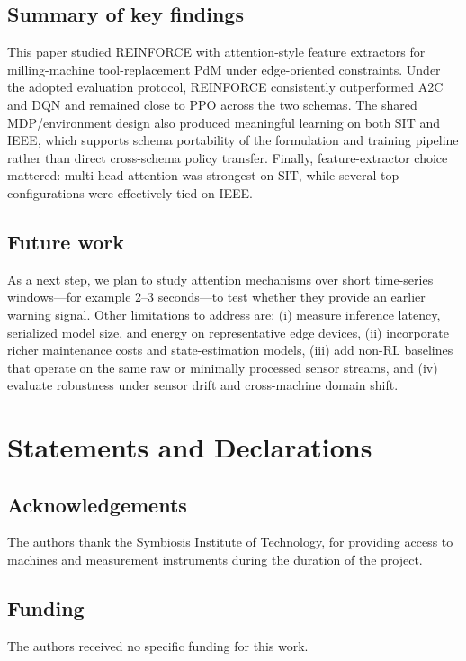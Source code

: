 \documentclass[sn-vancouver-num]{sn-jnl}%
\begin{document}
\subsection{Summary of key findings}
This paper studied \textsc{REINFORCE} with attention-style feature extractors for milling-machine tool-replacement PdM under edge-oriented constraints. Under the adopted evaluation protocol, \textsc{REINFORCE} consistently outperformed \textsc{A2C} and \textsc{DQN} and remained close to \textsc{PPO} across the two schemas. The shared MDP/environment design also produced meaningful learning on both SIT and IEEE, which supports schema portability of the formulation and training pipeline rather than direct cross-schema policy transfer. Finally, feature-extractor choice mattered: multi-head attention was strongest on SIT, while several top configurations were effectively tied on IEEE.

\subsection{Future work}
As a next step, we plan to study attention mechanisms over short time-series windows---for example 2--3 seconds---to test whether they provide an earlier warning signal. Other limitations to address are: (i) measure inference latency, serialized model size, and energy on representative edge devices, (ii) incorporate richer maintenance costs and state-estimation models, (iii) add non-RL baselines that operate on the same raw or minimally processed sensor streams, and (iv) evaluate robustness under sensor drift and cross-machine domain shift.


\section*{Statements and Declarations}

\subsection*{Acknowledgements}
The authors thank the Symbiosis Institute of Technology, for providing access to machines and measurement instruments during the duration of the project.

\subsection*{Funding}
The authors received no specific funding for this work.
\end{document}
